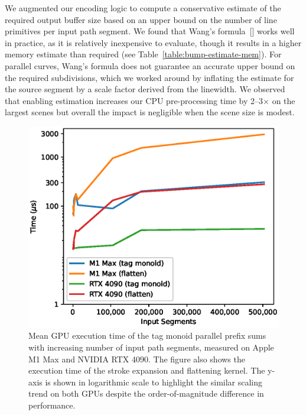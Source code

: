 \documentclass[sigconf, nonacm]{acmart}
\begin{document}
We augmented our encoding logic to compute a conservative estimate of the required output buffer size based on an upper bound on the number of line primitives per input path segment. We found that Wang's formula~[] works well in practice, as it is relatively inexpensive to evaluate, though it results in a higher memory estimate than required (see Table~\ref{table:bump-estimate-mem}). For parallel curves, Wang's formula does not guarantee an accurate upper bound on the required subdivisions, which we worked around by inflating the estimate for the source segment by a scale factor derived from the linewidth. We observed that enabling estimation increases our CPU pre-processing time by 2--3$\times$ on the largest scenes but overall the impact is negligible when the scene size is modest.

\begin{figure}
    \includegraphics[scale=0.66]{tag_monoid_gpu_timings}
    \caption{Mean GPU execution time of the tag monoid parallel prefix sums with increasing number of input path segments, measured on Apple M1 Max and NVIDIA RTX 4090. The figure also shows the execution time of the stroke expansion and flattening kernel. The y-axis is shown in logarithmic scale to highlight the similar scaling trend on both GPUs despite the order-of-magnitude difference in performance.}
    \label{fig:tag-monoid-gpu-timings}
\end{figure}
\end{document}
